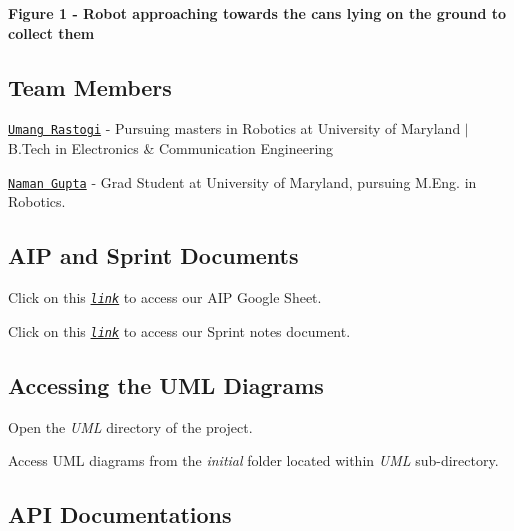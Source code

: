  {\bfseries Figure 1 -\/ Robot approaching towards the cans lying on the ground to collect them} 

\subsection*{Team Members}


\begin{DoxyItemize}
\item \href{https://github.com/urastogi885}{\tt Umang Rastogi} -\/ Pursuing masters in Robotics at University of Maryland $\vert$ B.\+Tech in Electronics \& Communication Engineering
\item \href{https://github.com/namangupta98}{\tt Naman Gupta} -\/ Grad Student at University of Maryland, pursuing M.\+Eng. in Robotics.
\end{DoxyItemize}

\subsection*{A\+IP and Sprint Documents}


\begin{DoxyItemize}
\item Click on this \href{https://docs.google.com/spreadsheets/d/1k6e7rM7TTvE5w2fQ_wuSDY_giNWaVuCHeImB6D53lT4/edit?usp=sharing}{\tt {\itshape link}} to access our A\+IP Google Sheet.
\item Click on this \href{https://docs.google.com/document/d/1iQZUstgoCCvtSvlcv1_xpxGW6ntUbkOpcgMuvrSP_ms/edit?usp=sharing}{\tt {\itshape link}} to access our Sprint notes document.
\end{DoxyItemize}

\subsection*{Accessing the U\+ML Diagrams}


\begin{DoxyItemize}
\item Open the {\itshape U\+ML} directory of the project.
\item Access U\+ML diagrams from the {\itshape initial} folder located within {\itshape U\+ML} sub-\/directory.
\end{DoxyItemize}

\subsection*{A\+PI Documentations}

